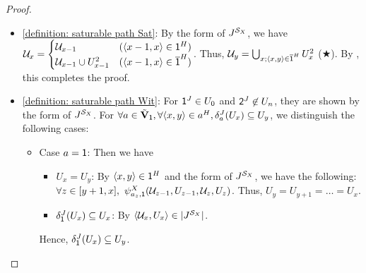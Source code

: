 \begin{proof}
\begin{itemize}
              \item \ref{definition: saturable path Sat}:
                     By the form of $\graph[3]^{\FillS_{\Aset}}$,
                     we have $\mathcal{U}_{x} = \begin{cases}
                                   \mathcal{U}_{x-1}                & (\tuple{x-1, x} \in \id^{\graph[2]})       \\
                                   \mathcal{U}_{x-1} \cup U_{x-1}^2 & (\tuple{x-1, x} \in \com{\id}^{\graph[2]})
                            \end{cases}$.
                     Thus, $\mathcal{U}_y = \bigcup_{x; \tuple{x, y} \in \com{\id}^{\graph[2]}} U_{x}^2$ ($\bigstar$).
                     By , this completes the proof.
 
              \item \ref{definition: saturable path Wit}:
                    For $\src^{\graph[3]} \in U_0$ and $\tgt^{\graph[3]} \not\in U_n$, they are shown by the form of $\graph[3]^{\FillS_{\Aset}}$.
                    For $\forall a \in \tilde{\vsig}_{\id}, \forall \tuple{x, y} \in a^{\graph[2]}, \delta_{a}^{\graph[3]}(U_{x}) \subseteq U_{y}$,
                    we distinguish the following cases:
                    \begin{itemize}
                     \item Case $a = \mathsf{1}$:
                     Then we have 
                     \begin{itemize}
                            \item $U_{x} = U_{y}$:
                            By $\tuple{x, y} \in \id^{\graph[2]}$ and the form of $\graph[3]^{\FillS_{\Aset}}$, we have the following: $\forall z \in \range{y + 1, x},\ \fml[2]_{a_{z}, \id}^{\Aset}(\mathcal{U}_{z-1}, U_{z-1}, \mathcal{U}_{z}, U_{z})$.
                            Thus, $U_{y} = U_{y + 1} = \dots = U_{x}$.
                            \item $\delta_{\id}^{\graph[3]}(U_{x}) \subseteq U_{x}$:
                            By $\tuple{\mathcal{U}_{x}, U_{x}} \in \domain{\graph[3]^{\FillS_{\Aset}}}$.
                     \end{itemize}
                     Hence, $\delta_{\id}^{\graph[3]}(U_{x}) \subseteq U_{y}$.


\end{itemize}
\end{itemize}
\end{proof}
